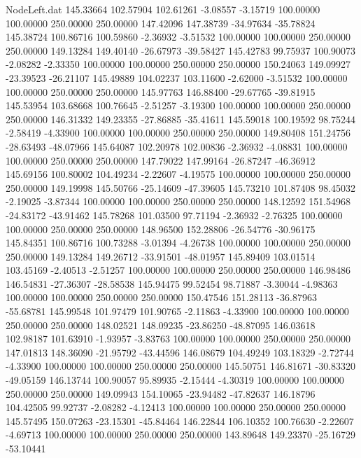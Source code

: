 \begin{filecontents}{NodeLeft.dat}
 145.33664  102.57904  102.61261    -3.08557   -3.15719  100.00000  100.00000  250.00000  250.00000  147.42096  147.38739  -34.97634  -35.78824
 145.38724  100.86716  100.59860    -2.36932   -3.51532  100.00000  100.00000  250.00000  250.00000  149.13284  149.40140  -26.67973  -39.58427
 145.42783   99.75937  100.90073    -2.08282   -2.33350  100.00000  100.00000  250.00000  250.00000  150.24063  149.09927  -23.39523  -26.21107
 145.49889  104.02237  103.11600    -2.62000   -3.51532  100.00000  100.00000  250.00000  250.00000  145.97763  146.88400  -29.67765  -39.81915
 145.53954  103.68668  100.76645    -2.51257   -3.19300  100.00000  100.00000  250.00000  250.00000  146.31332  149.23355  -27.86885  -35.41611
 145.59018  100.19592   98.75244    -2.58419   -4.33900  100.00000  100.00000  250.00000  250.00000  149.80408  151.24756  -28.63493  -48.07966
 145.64087  102.20978  102.00836    -2.36932   -4.08831  100.00000  100.00000  250.00000  250.00000  147.79022  147.99164  -26.87247  -46.36912
 145.69156  100.80002  104.49234    -2.22607   -4.19575  100.00000  100.00000  250.00000  250.00000  149.19998  145.50766  -25.14609  -47.39605
 145.73210  101.87408   98.45032    -2.19025   -3.87344  100.00000  100.00000  250.00000  250.00000  148.12592  151.54968  -24.83172  -43.91462
 145.78268  101.03500   97.71194    -2.36932   -2.76325  100.00000  100.00000  250.00000  250.00000  148.96500  152.28806  -26.54776  -30.96175
 145.84351  100.86716  100.73288    -3.01394   -4.26738  100.00000  100.00000  250.00000  250.00000  149.13284  149.26712  -33.91501  -48.01957
 145.89409  103.01514  103.45169    -2.40513   -2.51257  100.00000  100.00000  250.00000  250.00000  146.98486  146.54831  -27.36307  -28.58538
 145.94475   99.52454   98.71887    -3.30044   -4.98363  100.00000  100.00000  250.00000  250.00000  150.47546  151.28113  -36.87963  -55.68781
 145.99548  101.97479  101.90765    -2.11863   -4.33900  100.00000  100.00000  250.00000  250.00000  148.02521  148.09235  -23.86250  -48.87095
 146.03618  102.98187  101.63910    -1.93957   -3.83763  100.00000  100.00000  250.00000  250.00000  147.01813  148.36090  -21.95792  -43.44596
 146.08679  104.49249  103.18329    -2.72744   -4.33900  100.00000  100.00000  250.00000  250.00000  145.50751  146.81671  -30.83320  -49.05159
 146.13744  100.90057   95.89935    -2.15444   -4.30319  100.00000  100.00000  250.00000  250.00000  149.09943  154.10065  -23.94482  -47.82637
 146.18796  104.42505   99.92737    -2.08282   -4.12413  100.00000  100.00000  250.00000  250.00000  145.57495  150.07263  -23.15301  -45.84464
 146.22844  106.10352  100.76630    -2.22607   -4.69713  100.00000  100.00000  250.00000  250.00000  143.89648  149.23370  -25.16729  -53.10441

\end{filecontents}
